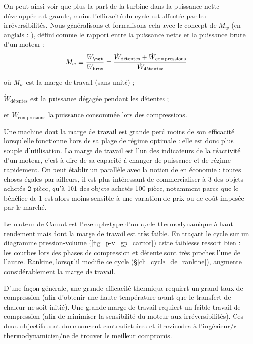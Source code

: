 		On peut ainsi voir que plus la part de la turbine dans la puissance nette développée est grande, moins l’efficacité du cycle est affectée par les irréversibilités. Nous généralisons et formalisons cela avec le concept de  $M_w$ (en anglais : ), défini comme le rapport entre la puissance nette et la puissance brute d’un moteur :
		\begin{equation}
			M_w \equiv 	\frac{\dot W_\net}{\dot W_\text{brut}}	= \frac{\dot W_\text{détentes} + \dot W_\text{compressions}}{\dot W_\text{détentes}}
			\label{eq_marge_travail}
		\end{equation}
		\begin{equationterms}
			\item où \tab $M_w$ 									\tab\tab\tab\tab\tab\tab\tab\tab est la marge de travail (sans unité) ;
			\item \tab $\dot W_\text{détentes}$ 			\tab\tab\tab\tab est la puissance dégagée pendant les détentes ;
			\item et \tab $\dot W_\text{compressions}$ 	\tab la puissance consommée lors des compressions.
		\end{equationterms}

		Une machine dont la marge de travail est grande perd moins de son efficacité lorsqu’elle fonctionne hors de sa plage de régime optimale : elle est donc plus souple d’utilisation. La marge de travail est l’un des indicateurs de la réactivité d’un moteur, c’est-à-dire de sa capacité à changer de puissance et de régime rapidement. On peut établir un parallèle avec la notion de  en économie : toutes choses égales par ailleurs, il est plus intéressant de commercialiser à \SI{3}{\euroo} des objets achetés \SI{2}{\euroo} pièce, qu’à \SI{101}{\euroo} des objets achetés \SI{100}{\euroo} pièce, notamment parce que le bénéfice de \SI{1}{\euroo} est alors moins sensible à une variation de prix ou de coût imposée par le marché.
		
			Le moteur de Carnot est l’exemple-type d’un cycle thermodynamique à haut rendement mais dont la marge de travail est très faible. En traçant le cycle sur un diagramme pression-volume (\cref{fig_p-v_gp_carnot}) cette faiblesse ressort bien : les courbes lors des phases de compression et détente sont très proches l’une de l’autre. Rankine, lorsqu’il modifie ce cycle (\S\ref{ch_cycle_de_rankine}), augmente considérablement la marge de travail.

		D’une façon générale, une grande efficacité thermique requiert un grand taux de compression (afin d’obtenir une haute température avant que le transfert de chaleur ne soit initié). Une grande marge de travail requiert un faible travail de compression (afin de minimiser la sensibilité du moteur aux irréversibilités). Ces deux objectifs sont donc souvent contradictoires et il reviendra à l’ingénieur/e thermodynamicien/ne de trouver le meilleur compromis.
		 

